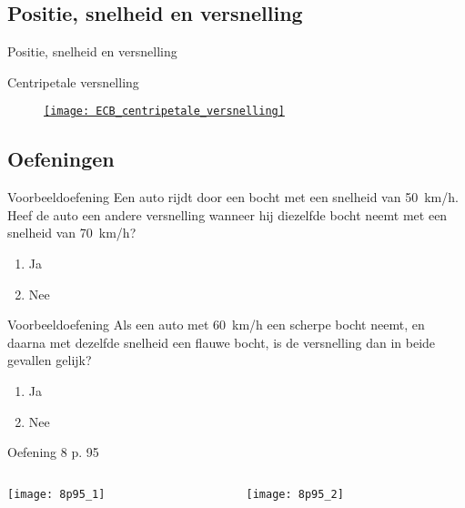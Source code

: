 


\subsection{Positie, snelheid en versnelling}

\begin{frame}{Positie, snelheid en versnelling}
\end{frame}

\begin{frame}{Centripetale versnelling}
\begin{figure}
\href{run:./app/ECB_centripetale_versnelling.ggb}{%
\texttt{[image: ECB\_centripetale\_versnelling]}%
}
\end{figure}
\end{frame}


\subsection{Oefeningen}


\begin{frame}{Voorbeeldoefening}
Een auto rijdt door een bocht met een snelheid van \SI{50}{km/h}. Heef de auto een andere versnelling wanneer hij diezelfde bocht neemt met een snelheid van \SI{70}{km/h}?%
\begin{enumerate}
\item Ja
\item Nee
\end{enumerate}

\end{frame}

\begin{frame}{Voorbeeldoefening}
Als een auto met \SI{60}{km/h} een scherpe bocht neemt, en daarna met dezelfde snelheid een flauwe bocht, is de versnelling dan in beide gevallen gelijk?%
\begin{enumerate}
\item Ja
\item Nee
\end{enumerate}
\end{frame}



\begin{frame}{Oefening 8 p. 95}
\begin{columns}[T]
    \begin{column}{0.5\textwidth}
    	\texttt{[image: 8p95\_1]}
    \end{column}
    \begin{column}{0.5\textwidth}
    	\texttt{[image: 8p95\_2]}
    \end{column}
\end{columns}
\end{frame}


